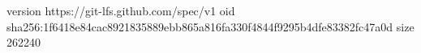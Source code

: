 version https://git-lfs.github.com/spec/v1
oid sha256:1f6418e84cac8921835889ebb865a816fa330f4844f9295b4dfe83382fc47a0d
size 262240
